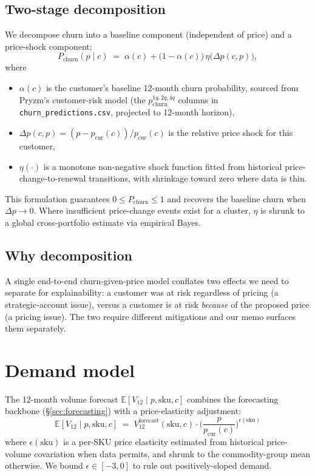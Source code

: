 \documentclass[11pt,a4paper]{article}
\newcommand{\E}{\mathbb{E}}
\newcommand{\sku}{\mathrm{sku}}
\begin{document}
\subsection{Two-stage decomposition}
We decompose churn into a baseline component (independent of price) and a price-shock component:
\begin{equation}
P_{\text{churn}}(p \mid c) \;=\; \alpha(c) + \bigl(1 - \alpha(c)\bigr)\,\eta\bigl(\Delta p(c, p)\bigr),
\end{equation}
where
\begin{itemize}[leftmargin=2em,itemsep=2pt]
\item $\alpha(c)$ is the customer's baseline 12-month churn probability, sourced from Pryzm's customer-risk model (the $p_{\text{churn}}^{1q,2q,4q}$ columns in \texttt{churn\_predictions.csv}, projected to 12-month horizon),
\item $\Delta p(c, p) = (p - p_{\text{cur}}(c)) / p_{\text{cur}}(c)$ is the relative price shock for this customer,
\item $\eta(\cdot)$ is a monotone non-negative shock function fitted from historical price-change-to-renewal transitions, with shrinkage toward zero where data is thin.
\end{itemize}
This formulation guarantees $0 \leq P_{\text{churn}} \leq 1$ and recovers the baseline churn when $\Delta p \to 0$. Where insufficient price-change events exist for a cluster, $\eta$ is shrunk to a global cross-portfolio estimate via empirical Bayes.

\subsection{Why decomposition}
A single end-to-end churn-given-price model conflates two effects we need to separate for explainability: a customer was at risk regardless of pricing (a strategic-account issue), versus a customer is at risk \emph{because} of the proposed price (a pricing issue). The two require different mitigations and our memo surfaces them separately.

\section{Demand model}
\label{sec:demand}

The 12-month volume forecast $\E[V_{12} \mid p, \sku, c]$ combines the forecasting backbone (§\ref{sec:forecasting}) with a price-elasticity adjustment:
\begin{equation}
\E[V_{12} \mid p, \sku, c] \;=\; V_{12}^{\text{forecast}}(\sku, c) \cdot \biggl( \frac{p}{p_{\text{cur}}(c)} \biggr)^{\!\epsilon(\sku)}
\end{equation}
where $\epsilon(\sku)$ is a per-SKU price elasticity estimated from historical price-volume covariation when data permits, and shrunk to the commodity-group mean otherwise. We bound $\epsilon \in [-3, 0]$ to rule out positively-sloped demand.
\end{document}
